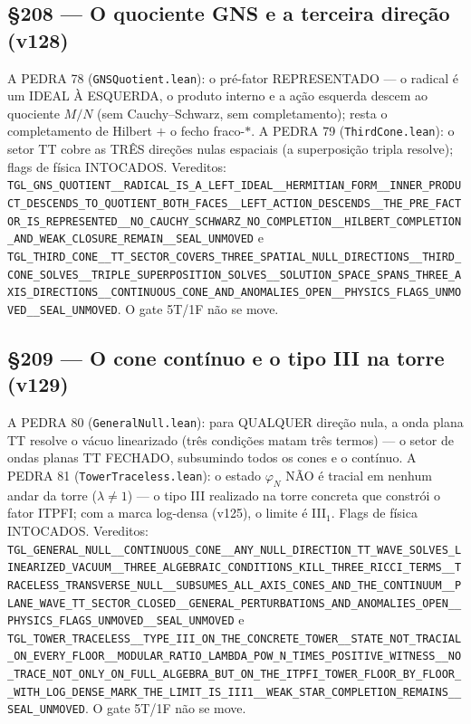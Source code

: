 \documentclass[11pt]{article}
\theoremstyle{definition}\newtheorem{deriv}{Derivação}
\begin{document}
\subsection*{\S208 --- O quociente GNS e a terceira direção (v128)}A PEDRA 78 (\texttt{GNSQuotient.lean}): o pré-fator REPRESENTADO — o radical é um IDEAL À ESQUERDA, o produto interno e a ação esquerda descem ao quociente $M/N$ (sem Cauchy--Schwarz, sem completamento); resta o completamento de Hilbert $+$ o fecho fraco-$*$. A PEDRA 79 (\texttt{ThirdCone.lean}): o setor TT cobre as TRÊS direções nulas espaciais (a superposição tripla resolve); flags de física INTOCADOS. Vereditos: \texttt{TGL\_GNS\_QUOTIENT\_\_RADICAL\_IS\_A\_LEFT\_IDEAL\_\_HERMITIAN\_FORM\_\_INNER\_PRODUCT\_DESCENDS\_TO\_QUOTIENT\_BOTH\_FACES\_\_LEFT\_ACTION\_DESCENDS\_\_THE\_PRE\_FACTOR\_IS\_REPRESENTED\_\_NO\_CAUCHY\_SCHWARZ\_NO\_COMPLETION\_\_HILBERT\_COMPLETION\_AND\_WEAK\_CLOSURE\_REMAIN\_\_SEAL\_UNMOVED} e \texttt{TGL\_THIRD\_CONE\_\_TT\_SECTOR\_COVERS\_THREE\_SPATIAL\_NULL\_DIRECTIONS\_\_THIRD\_CONE\_SOLVES\_\_TRIPLE\_SUPERPOSITION\_SOLVES\_\_SOLUTION\_SPACE\_SPANS\_THREE\_AXIS\_DIRECTIONS\_\_CONTINUOUS\_CONE\_AND\_ANOMALIES\_OPEN\_\_PHYSICS\_FLAGS\_UNMOVED\_\_SEAL\_UNMOVED}. O gate 5T/1F não se move.

\subsection*{\S209 --- O cone contínuo e o tipo III na torre (v129)}A PEDRA 80 (\texttt{GeneralNull.lean}): para QUALQUER direção nula, a onda plana TT resolve o vácuo linearizado (três condições matam três termos) --- o setor de ondas planas TT FECHADO, subsumindo todos os cones e o contínuo. A PEDRA 81 (\texttt{TowerTraceless.lean}): o estado $\varphi_N$ NÃO é tracial em nenhum andar da torre ($\lambda\neq1$) --- o tipo III realizado na torre concreta que constrói o fator ITPFI; com a marca log-densa (v125), o limite é III$_1$. Flags de física INTOCADOS. Vereditos: \texttt{TGL\_GENERAL\_NULL\_\_CONTINUOUS\_CONE\_\_ANY\_NULL\_DIRECTION\_TT\_WAVE\_SOLVES\_LINEARIZED\_VACUUM\_\_THREE\_ALGEBRAIC\_CONDITIONS\_KILL\_THREE\_RICCI\_TERMS\_\_TRACELESS\_TRANSVERSE\_NULL\_\_SUBSUMES\_ALL\_AXIS\_CONES\_AND\_THE\_CONTINUUM\_\_PLANE\_WAVE\_TT\_SECTOR\_CLOSED\_\_GENERAL\_PERTURBATIONS\_AND\_ANOMALIES\_OPEN\_\_PHYSICS\_FLAGS\_UNMOVED\_\_SEAL\_UNMOVED} e \texttt{TGL\_TOWER\_TRACELESS\_\_TYPE\_III\_ON\_THE\_CONCRETE\_TOWER\_\_STATE\_NOT\_TRACIAL\_ON\_EVERY\_FLOOR\_\_MODULAR\_RATIO\_LAMBDA\_POW\_N\_TIMES\_POSITIVE\_WITNESS\_\_NO\_TRACE\_NOT\_ONLY\_ON\_FULL\_ALGEBRA\_BUT\_ON\_THE\_ITPFI\_TOWER\_FLOOR\_BY\_FLOOR\_\_WITH\_LOG\_DENSE\_MARK\_THE\_LIMIT\_IS\_III1\_\_WEAK\_STAR\_COMPLETION\_REMAINS\_\_SEAL\_UNMOVED}. O gate 5T/1F não se move.
\end{document}
